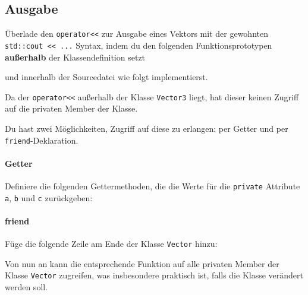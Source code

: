 \subsection{Ausgabe}
Überlade den \lstinline{operator<<} zur Ausgabe eines Vektors mit der gewohnten \lstinline{std::cout << ...} Syntax, indem du den folgenden Funktionsprototypen \textbf{außerhalb} der Klassendefinition setzt

  

und innerhalb der Sourcedatei wie folgt implementierst.

  

Da der \lstinline{operator<<} außerhalb der Klasse \lstinline{Vector3} liegt, hat dieser keinen Zugriff auf die privaten Member der Klasse.

Du hast zwei Möglichkeiten, Zugriff auf diese zu erlangen: per Getter und per \lstinline{friend}-Deklaration.

\paragraph{Getter}
Definiere die folgenden Gettermethoden, die die Werte für die \lstinline{private} Attribute \lstinline{a}, \lstinline{b} und \lstinline{c} zurückgeben:
  

\paragraph{friend}
Füge die folgende Zeile am Ende der Klasse \texttt{Vector} hinzu:
  
Von nun an kann die entsprechende Funktion auf alle privaten Member der Klasse \texttt{Vector} zugreifen, was insbesondere praktisch ist, falls die Klasse verändert werden soll.



